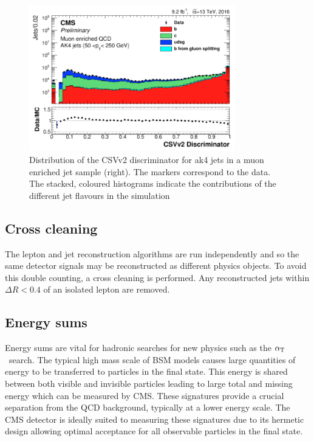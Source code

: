 \begin{figure}
\centering
    \includegraphics[width=0.8\textwidth]{./Figures/reconstruction/csv_fig.png}
  \caption{\label{fig:csv_fig} Distribution of the CSVv2 discriminator for ak4 jets 
in a muon enriched jet sample (right). The markers correspond to the data. 
The stacked, coloured histograms indicate the contributions of the different 
jet flavours in the simulation~\cite{csv_fig}}
\end{figure}

\subsection{Cross cleaning}

The lepton and jet reconstruction algorithms are run independently and so the same detector
signals may be reconstructed as different physics objects. To avoid this double
counting, a cross cleaning is performed. Any reconstructed jets within $\Delta R < 0.4$ 
of an isolated lepton are removed.

\subsection{Energy sums}
\label{sec:energy_sums_reco}
Energy sums are vital for hadronic searches for new physics such as the $\alpha_{\text{T}}$~search. The typical high
mass scale of BSM models causes large quantities of energy to be transferred to particles in the final
state. This energy is shared between both visible and invisible particles leading to large total and missing energy
which can be measured by CMS. These signatures provide a crucial separation from the QCD background, typically at
a lower energy scale. The CMS detector is ideally suited to measuring these signatures due to its hermetic design
allowing optimal acceptance for all observable particles in the final state.

